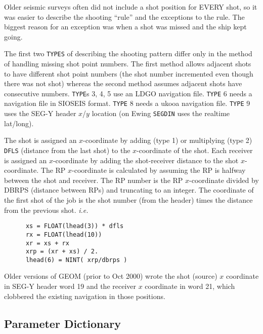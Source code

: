 Older seismic surveys often did not include a \gls{shot} position for EVERY
shot, so it was easier to describe the shooting ``rule'' and the
exceptions to the rule.  The biggest reason for an exception was
when a \gls{shot} was missed and the ship kept going.

The first two \texttt{TYPES} of describing the shooting pattern differ only in
the method of handling missing \gls{shot} point numbers.  The first method
allows adjacent \glspl{shot} to have different \gls{shot} point numbers (the \gls{shot}
number incremented even though there was not \gls{shot}) whereas the second
method assumes adjacent \glspl{shot} have consecutive numbers.  \texttt{TYPE}s 3, 4, 5
use an LDGO navigation file.  \texttt{TYPE} 6 needs a navigation file in
SIOSEIS format.  \texttt{TYPE} 8 needs a \gls{ukooa} navigation file.  \texttt{TYPE} 9 uses
the SEG-Y header $x$/$y$ location (on Ewing \texttt{SEGDIN} uses the realtime
lat/long).

The \gls{shot} is assigned an $x$-coordinate by adding (type 1) or multiplying
(type 2) \texttt{DFLS} (distance from the last \gls{shot}) to the $x$-coordinate of the
shot.  Each receiver is assigned an $x$-coordinate by adding the
shot-receiver distance to the \gls{shot} $x$-coordinate.  The  RP $x$-coordinate
is calculated by assuming the RP is halfway between the \gls{shot} and
receiver.  The RP number is the RP $x$-coordinate divided by DBRPS
(distance between RPs) and truncating to an integer.  The coordinate of
the first \gls{shot} of the job is the \gls{shot} number (from the header) times the
distance from the previous \gls{shot}.  \textit{i.e.}
\lstset{language=[77]Fortran}
\begin{lstlisting}
      xs = FLOAT(lhead(3)) * dfls
      rx = FLOAT(lhead(10))
      xr = xs + rx
      xrp = (xr + xs) / 2.
      lhead(6) = NINT( xrp/dbrps )
\end{lstlisting}

Older versions of GEOM (prior to Oct 2000) wrote the \gls{shot} (source)
$x$ coordinate in SEG-Y header word 19 and the receiver $x$ coordinate
in word 21, which clobbered the existing navigation in those positions.

\subsection{Parameter Dictionary}

